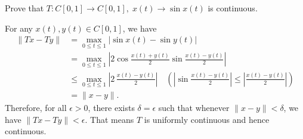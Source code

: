 \documentclass[12pt,letterpaper,boxed]{hmcpset}
\begin{document}
\begin{problem}[1.14]
	Prove that $T:C[0,1]\to C[0,1],\;x(t)\to \sin x(t)$ is continuous.
\end{problem}
\begin{solution}
	For any $x(t), y(t)\in C[0,1]$, we have
	\begin{align*}
		\|Tx-Ty\|&=\max_{0\le t\le 1}\left|\sin x(t)-\sin y(t)\right|\\
		&=\max_{0\le t\le 1}\left|2\cos\frac{x(t)+y(t)}{2}\sin\frac{x(t)-y(t)}{2}\right|\\
		&\le \max_{0\le t\le 1}\left|2\,\frac{x(t)-y(t)}{2}\right|\quad\left(\left|\sin\frac{x(t)-y(t)}{2}\right|\le \left|\frac{x(t)-y(t)}{2}\right|\right)\\
		&=\|x-y\|.
	\end{align*}
	Therefore, for all $\epsilon>0$, there exists $\delta=\epsilon$ such that whenever $\|x-y\|<\delta$, we have $\|Tx-Ty\|<\epsilon$. That means $T$ is uniformly continuous and hence continuous.
\end{solution}
\end{document}
